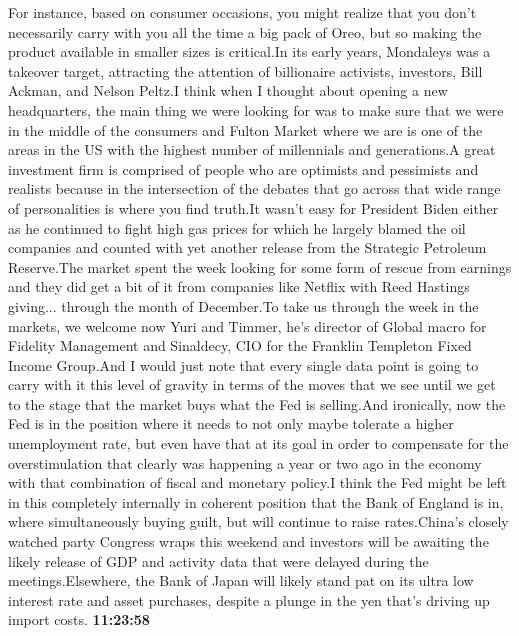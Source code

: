 \documentclass{article}%
\begin{document}
For instance, based on consumer occasions, you might realize that you don't necessarily carry with you all the time a big pack of Oreo, but so making the product available in smaller sizes is critical.In its early years, Mondaleys was a takeover target, attracting the attention of billionaire activists, investors, Bill Ackman, and Nelson Peltz.I think when I thought about opening a new headquarters, the main thing we were looking for was to make sure that we were in the middle of the consumers and Fulton Market where we are is one of the areas in the US with the highest number of millennials and generations.A great investment firm is comprised of people who are optimists and pessimists and realists because in the intersection of the debates that go across that wide range of personalities is where you find truth.It wasn't easy for President Biden either as he continued to fight high gas prices for which he largely blamed the oil companies and counted with yet another release from the Strategic Petroleum Reserve.The market spent the week looking for some form of rescue from earnings and they did get a bit of it from companies like Netflix with Reed Hastings giving...  through the month of December.To take us through the week in the markets, we welcome now Yuri and Timmer, he's director of Global macro for Fidelity Management and Sinaldecy, CIO for the Franklin Templeton Fixed Income Group.And I would just note that every single data point is going to carry with it this level of gravity in terms of the moves that we see until we get to the stage that the market buys what the Fed is selling.And ironically, now the Fed is in the position where it needs to not only maybe tolerate a higher unemployment rate, but even have that at its goal in order to compensate for the overstimulation that clearly was happening a year or two ago in the economy with that combination of fiscal and monetary policy.I think the Fed might be left in this completely internally in coherent position that the Bank of England is in, where simultaneously buying guilt, but will continue to raise rates.China's closely watched party Congress wraps this weekend and investors will be awaiting the likely release of GDP and activity data that were delayed during the meetings.Elsewhere, the Bank of Japan will likely stand pat on its ultra low interest rate and asset purchases, despite a plunge in the yen that's driving up import costs.%
\textbf{11:23:58}%
\end{document}
